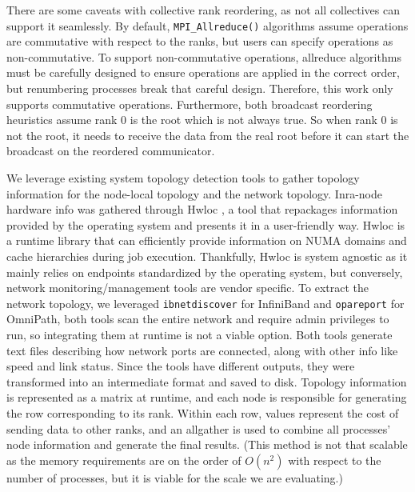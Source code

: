 There are some caveats with collective rank reordering, as not all collectives can support it seamlessly.
By default, \texttt{MPI\_Allreduce()} algorithms assume operations are commutative with respect to the ranks, but users can specify operations as non-commutative.
To support non-commutative operations, allreduce algorithms must be carefully designed to ensure operations are applied in the correct order, but renumbering processes break that careful design.
Therefore, this work only supports commutative operations.
Furthermore, both broadcast reordering heuristics assume rank 0 is the root which is not always true. 
So when rank 0 is not the root, it needs to receive the data from the real root before it can start the broadcast on the reordered communicator.

We leverage existing system topology detection tools to gather topology information for the node-local topology and the network topology.
Inra-node hardware info was gathered through Hwloc \cite{Broquedis2010hwloc}, a tool that repackages information provided by the operating system and presents it in a user-friendly way.
Hwloc is a runtime library that can efficiently provide information on \gls{NUMA} domains and cache hierarchies during job execution.
Thankfully, Hwloc is system agnostic as it mainly relies on endpoints standardized by the operating system, but conversely, network monitoring/management tools are vendor specific.
To extract the network topology, we leveraged \texttt{ibnetdiscover} for InfiniBand and \texttt{opareport} for OmniPath, both tools scan the entire network and require admin privileges to run, so integrating them at runtime is not a viable option.
Both tools generate text files describing how network ports are connected, along with other info like speed and link status.
Since the tools have different outputs, they were transformed into an intermediate format and saved to disk.
Topology information is represented as a matrix at runtime, and each node is responsible for generating the row corresponding to its rank.
Within each row, values represent the cost of sending data to other ranks, and an allgather is used to combine all processes' node information and generate the final results.
(This method is not that scalable as the memory requirements are on the order of $O(n^2)$ with respect to the number of processes, but it is viable for the scale we are evaluating.)

